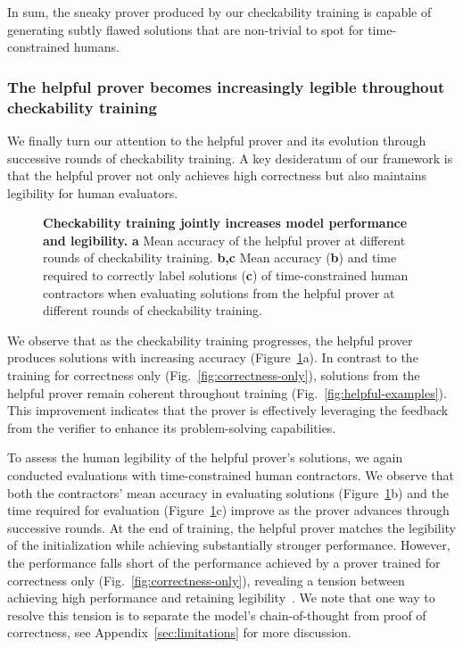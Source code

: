 \documentclass{article}
\begin{document}
In sum, the sneaky prover produced by our checkability training is capable of generating subtly flawed solutions that are non-trivial to spot for time-constrained humans.

\subsubsection{The helpful prover becomes increasingly legible throughout checkability training}\label{subsec:honest-legible}

We finally turn our attention to the helpful prover and its evolution through successive rounds of checkability training. A key desideratum of our framework is that the helpful prover not only achieves high correctness but also maintains legibility for human evaluators.


\begin{figure}
    \centering
    \caption{\textbf{Checkability training jointly increases model performance and legibility.} \textbf{a} Mean accuracy of the helpful prover at different rounds of checkability training. \textbf{b,c} Mean accuracy (\textbf{b}) and time required to correctly label solutions (\textbf{c}) of time-constrained human contractors when evaluating solutions from the helpful prover at different rounds of checkability training.}
    \label{fig:v5g-human-data}
\end{figure}

We observe that as the checkability training progresses, the helpful prover produces solutions with increasing accuracy (Figure~\ref{fig:v5g-human-data}a). In contrast to the training for correctness only (Fig.~\ref{fig:correctness-only}), solutions from the helpful prover remain coherent throughout training (Fig.~\ref{fig:helpful-examples}). This improvement indicates that the prover is effectively leveraging the feedback from the verifier to enhance its problem-solving capabilities.

To assess the human legibility of the helpful prover's solutions, we again conducted evaluations with time-constrained human contractors. We observe that both the contractors' mean accuracy in evaluating solutions (Figure~\ref{fig:v5g-human-data}b) and the time required for evaluation (Figure~\ref{fig:v5g-human-data}c) improve as the prover advances through successive rounds. At the end of training, the helpful prover matches the legibility of the initialization while achieving substantially stronger performance. However, the performance falls short of the performance achieved by a prover trained for correctness only (Fig.~\ref{fig:correctness-only}), revealing a tension between achieving high performance and retaining legibility~\citep{leike2022distinguishing}. We note that one way to resolve this tension is to separate the model's chain-of-thought from proof of correctness, see Appendix~\ref{sec:limitations} for more discussion.
\end{document}
